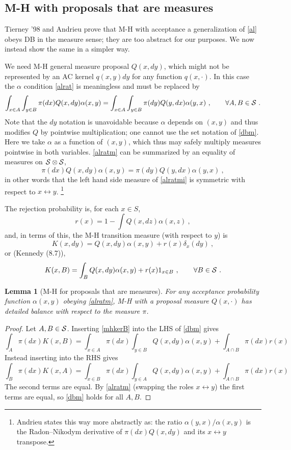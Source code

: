 \documentclass[10pt]{article}
\newcommand{\be}{\begin{equation}}
\newcommand{\ee}{\end{equation}}
\newtheorem{lem}[thm]{Lemma}
\newcommand{\al}{\alpha}
\begin{document}
\subsection{M-H with proposals that are measures}

Tierney '98 and Andrieu prove that M-H with acceptance a generalization of
\eqref{al}
obeys DB in the measure sense; they are too abstract for our purposes.
We now instead show the same in a simpler way.

We need M-H general measure proposal $Q(x,dy)$, which might not
be represented by an AC kernel $q(x,y)dy$ for any function $q(x,\cdot)$.
In this case the $\al$ condition \eqref{alrat} is meaningless and must be replaced by
\be
\int_{x\in A} \int_{y \in B} \pi(dx) Q(x,dy) \al(x,y) = \int_{x\in A} \int_{y\in B} \pi(dy) Q(y,dx) \al(y,x)~, \qquad \forall A,B \in \cal S~.
\label{alratm}
\ee
Note that the $dy$ notation is unavoidable because
$\al$ depends on $(x,y)$ and thus modifies $Q$ by pointwise multiplication;
one cannot use the set notation of \eqref{dbm}.
Here we take $\al$ as a function of $(x,y)$, which thus may safely multiply
measures pointwise in both variables.
\eqref{alratm} can be summarized by an equality of
measures on $\cal S \otimes \cal S$,
\be
\pi(dx) Q(x,dy) \al(x,y) = \pi(dy) Q(y,dx) \al(y,x)~,
\label{alratmi}
\ee
in other words that the left hand side measure of \eqref{alratmi} is symmetric
with respect to $x\leftrightarrow y$.
\footnote{Andrieu states this way more abstractly as: the ratio $\al(y,x)/\al(x,y)$
is the Radon--Nikodym derivative of $\pi(dx) Q(x,dy)$ and its
$x\leftrightarrow y$ transpose.}


The rejection probability is, for each $x\in S$,
\be
r(x) = 1 - \int Q(x,dz) \al(x,z)~,
\label{rejm}
\ee
and, in terms of this, the M-H transition measure (with respect to $y$) is
\be
K(x,dy) = Q(x,dy) \al(x,y) + r(x) \delta_x(dy)~,
\label{mhkerm}
\ee
or (Kennedy (8.7)),
\be
K(x,B) = \int_B Q(x,dy) \al(x,y) + r(x) 1_{x\in B}~, \qquad \forall B \in \cal S
~.
\label{mhkerB}
\ee

\begin{lem}[M-H for proposals that are measures]
  For any acceptance probability function $\al(x,y)$ obeying \eqref{alratm},
  M-H with a proposal measure $Q(x,\cdot)$ has detailed balance with respect to the measure $\pi$.
  \label{l:mh}
\end{lem}
\begin{proof}
  Let $A,B\in \cal S$.
  Inserting \eqref{mhkerB} into the LHS of \eqref{dbm}
  gives
  $$
  \int_A \pi(dx) K(x,B) = \int_{x\in A} \pi(dx) \int_{y\in B} Q(x,dy) \al(x,y)
  + \int_{A\cap B} \pi(dx) r(x)
  $$
  Instead inserting into the RHS gives
  $$
  \int_B \pi(dx) K(x,A) = \int_{x\in B} \pi(dx) \int_{y\in A} Q(x,dy) \al(x,y)
  + \int_{A\cap B} \pi(dx) r(x)
  $$
  The second terms are equal.
  By \eqref{alratm} (swapping the roles $x\leftrightarrow y$) the first terms are equal,
  so \eqref{dbm} holds for all $A,B$.
\end{proof}
\end{document}
